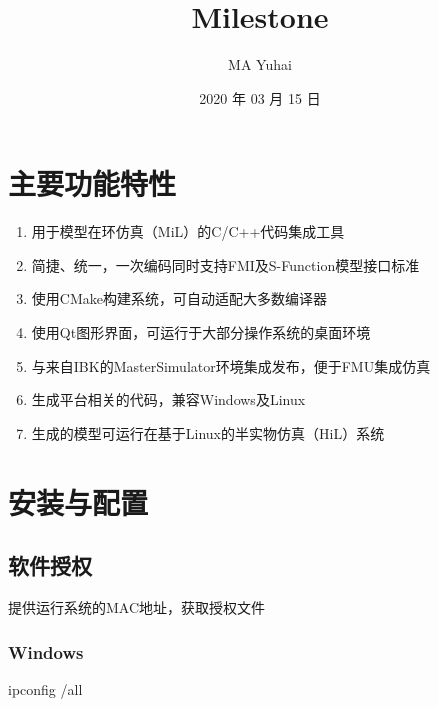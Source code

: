 \documentclass[letterpaper,10pt,english]{sphinxmanual}
\title{Milestone}
\date{2020 年 03 月 15 日}
\author{MA Yuhai}
\begin{document}
\pagestyle{empty}
\sphinxmaketitle
\pagestyle{plain}
\sphinxtableofcontents
\pagestyle{normal}
\label{\detokenize{index::doc}}



\chapter{主要功能特性}
\label{\detokenize{intro/index:id1}}\label{\detokenize{intro/index::doc}}\begin{enumerate}
%
\item {} 
用于模型在环仿真（MiL）的C/C++代码集成工具

\item {} 
简捷、统一，一次编码同时支持FMI及S-Function模型接口标准

\item {} 
使用CMake构建系统，可自动适配大多数编译器

\item {} 
使用Qt图形界面，可运行于大部分操作系统的桌面环境

\item {} 
与来自IBK的MasterSimulator环境集成发布，便于FMU集成仿真

\item {} 
生成平台相关的代码，兼容Windows及Linux

\item {} 
生成的模型可运行在基于Linux的半实物仿真（HiL）系统

\end{enumerate}


\chapter{安装与配置}
\label{\detokenize{install/index:id1}}\label{\detokenize{install/index::doc}}

\section{软件授权}
\label{\detokenize{install/_u8f6f_u4ef6_u5b89_u88c5:id1}}\label{\detokenize{install/_u8f6f_u4ef6_u5b89_u88c5::doc}}
提供运行系统的MAC地址，获取授权文件


\subsection{Windows}
\label{\detokenize{install/_u8f6f_u4ef6_u5b89_u88c5:windows}}
ipconfig /all
\end{document}
